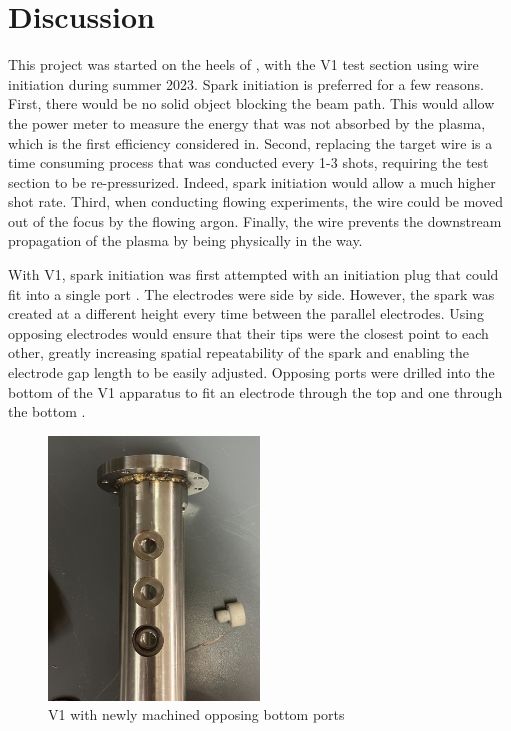 \chapter{Discussion}


This project was started on the heels of \textcite{duplayArgonLaserPlasmaThruster2024a}, with the V1 test section using wire initiation during summer 2023. Spark initiation is preferred for a few reasons. First, there would be no solid object blocking the beam path. This would allow the power meter to measure the energy that was not absorbed by the plasma, which is the first efficiency considered in. Second, replacing the target wire is a time consuming process that was conducted every 1-3 shots, requiring the test section to be re-pressurized. Indeed, spark initiation would allow a much higher shot rate. Third, when conducting flowing experiments, the wire could be moved out of the focus by the flowing argon. Finally, the wire prevents the downstream propagation of the plasma by being physically in the way.

With V1, spark initiation was first attempted with an initiation plug that could fit into a single port . The electrodes were side by side. However, the spark was created at a different height every time between the parallel electrodes. Using opposing electrodes would ensure that their tips were the closest point to each other, greatly increasing spatial repeatability of the spark and enabling the electrode gap length to be easily adjusted. Opposing ports were drilled into the bottom of the V1 apparatus to fit an electrode through the top and one through the bottom .

\begin{figure}[!ht]
    \centering
    \includegraphics[width=0.5\textwidth]{assets/5 discussion/Bottom ports machined.jpg}
    \caption{V1 with newly machined opposing bottom ports}
\end{figure}

